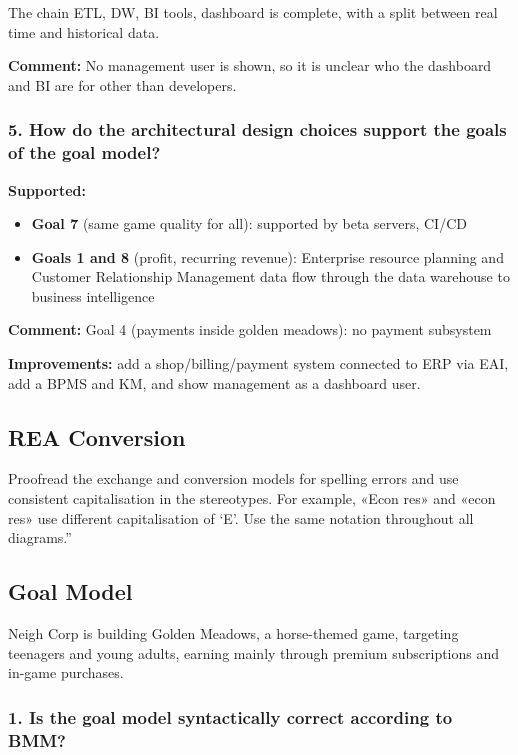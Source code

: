 \documentclass{article}
\begin{document}
The chain ETL, DW, BI tools, dashboard is complete, with a split between real time and historical data.

\textbf{Comment:} No management user is shown, so it is unclear who the dashboard and BI are for other than developers.

\subsubsection*{5. How do the architectural design choices support the goals of the goal model?}

\textbf{Supported:}
\begin{itemize}
    \item \textbf{Goal 7} (same game quality for all): supported by beta servers, CI/CD
    \item \textbf{Goals 1 and 8} (profit, recurring revenue): Enterprise resource planning and Customer Relationship Management data flow through the data warehouse to business intelligence
\end{itemize}

\textbf{Comment:} Goal 4 (payments inside golden meadows): no payment subsystem

\textbf{Improvements:} add a shop/billing/payment system connected to ERP via EAI, add a BPMS and KM, and show management as a dashboard user.

\subsection{REA Conversion}

Proofread the exchange and conversion models for spelling errors and use consistent capitalisation in the stereotypes. For example, «Econ res» and «econ res» use different capitalisation of ‘E’. Use the same notation throughout all diagrams.”

\subsection{Goal Model}

Neigh Corp is building Golden Meadows, a horse-themed game, targeting teenagers and young adults, earning mainly through premium subscriptions and in-game purchases.

\subsubsection*{1. Is the goal model syntactically correct according to BMM?}
\end{document}
